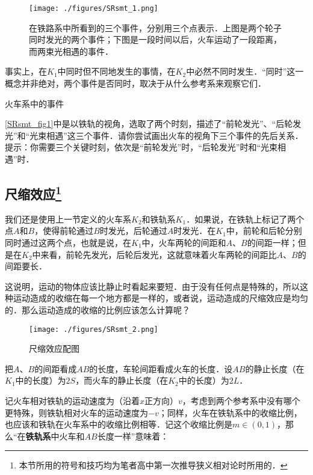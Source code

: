 \begin{figure}[ht]
\centering
\texttt{[image: ./figures/SRsmt\_1.png]}
\caption{在铁路系中所看到的三个事件，分别用三个点表示．上图是两个轮子同时发光的两个事件；下图是一段时间以后，火车运动了一段距离，而两束光相遇的事件．} \label{SRsmt_fig1}
\end{figure}

事实上，在$K_1$中同时但不同地发生的事情，在$K_2$中必然不同时发生．“同时”这一概念并非绝对，两个事件是否同时，取决于从什么参考系来观察它们．

\begin{exercise}{火车系中的事件}

\autoref{SRsmt_fig1}中是以铁轨的视角，选取了两个时刻，描述了“前轮发光”、“后轮发光”和“光束相遇”这三个事件．请你尝试画出火车的视角下三个事件的先后关系．提示：你需要三个关键时刻，依次是“前轮发光”时，“后轮发光”时和“光束相遇”时．

\end{exercise}

\subsection{尺缩效应\footnote{本节所用的符号和技巧均为笔者高中第一次推导狭义相对论时所用的．}}

我们还是使用上一节定义的火车系$K_2$和铁轨系$K_1$．如果说，在铁轨上标记了两个点$A$和$B$，使得前轮通过$B$时发光，后轮通过$A$时发光．在$K_1$中，前轮和后轮分别同时通过这两个点，也就是说，在$K_1$中，火车两轮的间距和$A$、$B$的间距一样；但是在$K_2$中来看，前轮先发光，后轮后发光，这就意味着火车两轮的间距比$A$、$B$的间距要长．

这说明，运动的物体应该比静止时看起来要短．由于没有任何点是特殊的，所以这种运动造成的收缩在每一个地方都是一样的，或者说，运动造成的尺缩效应是均匀的．那么运动造成的收缩的比例应该怎么计算呢？

\begin{figure}[ht]
\centering
\texttt{[image: ./figures/SRsmt\_2.png]}
\caption{尺缩效应配图} \label{SRsmt_fig2}
\end{figure}

把$A$、$B$的间距看成$AB$的长度，车轮间距看成火车的长度．设$AB$的静止长度（在$K_1$中的长度）为$2S$，而火车的静止长度（在$K_2$中的长度）为$2L$．

记火车相对铁轨的运动速度为（沿着$x$正方向）$v$，考虑到两个参考系中没有哪个更特殊，则铁轨相对火车的运动速度为$-v$；同样，火车在铁轨系中的收缩比例，也应该和铁轨在火车系中的收缩比例相等．记这个收缩比例是$m\in(0,1)$，那么“在\textbf{铁轨系}中火车和$AB$长度一样”意味着：

